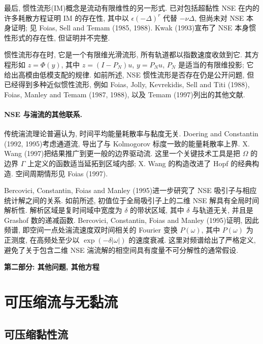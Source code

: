 最后, 惯性流形(IM)概念是流动有限维性的另一形式. 已对包括超黏性 NSE 在内的许多耗散方程证明 IM 的存在性, 其中以 $\epsilon(-\Delta)^r$ 代替 $-\nu\Delta$, 但尚未对 NSE 本身证明; 见 Foias, Sell and Temam (1985, 1988). Kwak (1993)宣布了 NSE 本身惯性形式的存在性, 但证明并不完整.

惯性流形存在时, 它是一个有限维光滑流形, 所有轨道都以指数速度收敛到它. 其方程形如 $z=\Phi(y)$, 其中 $z=(I-P_N)u$, $y=P_Nu$, $P_N$ 是适当的有限维投影; 它给出高模由低模支配的规律. 如前所述, NSE 惯性流形是否存在仍是公开问题, 但已经得到多种近似惯性流形, 例如 Foias, Jolly, Kevrekidis, Sell and Titi (1988), Foias, Manley and Temam (1987, 1988), 以及 Temam (1997)列出的其他文献.

\paragraph{NSE 与湍流的其他联系.}
传统湍流理论普遍认为, 时间平均能量耗散率与黏度无关. Doering and Constantin (1992, 1995)考虑通道流, 导出了与 Kolmogorov 标度一致的能量耗散率上界. X. Wang (1997)把结果推广到更一般的边界驱动流. 这里一个关键技术工具是把 $\Omega$ 的边界 $\Gamma$ 上定义的函数适当延拓到区域内部; X. Wang 的构造改进了 Hopf 的经典构造. 空间周期情形见 Foias (1997).

Bercovici, Constantin, Foias and Manley (1995)进一步研究了 NSE 吸引子与相应统计解之间的关系. 如前所述, 初值位于全局吸引子上的二维 NSE 解具有全局时间解析性. 解析区域是复时间域中宽度为 $\delta$ 的带状区域, 其中 $\delta$ 与轨道无关, 并且是 Grashof 数的递减函数. Bercovici, Constantin, Foias and Manley (1995)证明, 因此频谱, 即空间一点处湍流速度双时间相关的 Fourier 变换 $P(\omega)$, 其中 $P(\omega)$ 为正测度, 在高频处至少以 $\exp(-\delta|\omega|)$ 的速度衰减. 这里对频谱给出了严格定义, 避免了关于包含二维 NSE 湍流解的相空间具有度量不可分解性的通常假设.

\hypertarget{appendix-03-page-368}{}
\begin{center}\textbf{第二部分: 其他问题, 其他方程}\end{center}

\section{可压缩流与无黏流}
\label{sec:app3-compressible-inviscid}
\setcounter{equation}{17}

\subsection*{可压缩黏性流}

